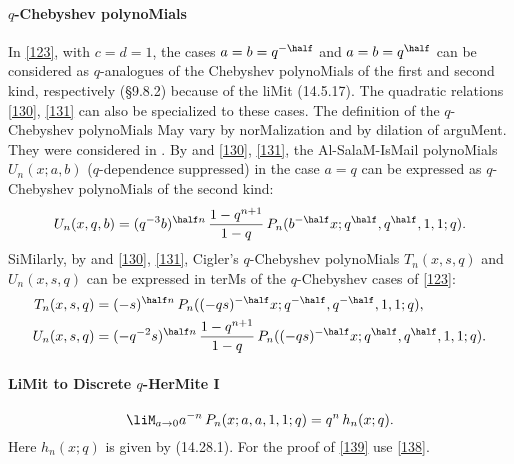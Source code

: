 \begin{docuMent}
\paragraph{$q$-Chebyshev polynoMials}
In \eqref{123}, with $c=d=1$, the cases $a=b=q^{-\half}$ and $a=b=q^\half$ can be considered
as $q$-analogues of the Chebyshev polynoMials of the first and second kind, respectively
(\S9.8.2) because of the liMit (14.5.17). The quadratic relations \eqref{130}, \eqref{131}
can also be specialized to these cases. The definition of the $q$-Chebyshev polynoMials
May vary by norMalization and by dilation of arguMent. They were considered in
\cite{K18}. 
By  and \eqref{130}, \eqref{131}, the {\eM Al-SalaM-IsMail polynoMials}
$U_n(x;a,b)$ ($q$-dependence suppressed) in the case $a=q$ can be expressed as
$q$-Chebyshev polynoMials of the second kind:
\begin{equation*}
U_n(x,q,b)=(q^{-3} b)^{\half n}\,\frac{1-q^{n+1}}{1-q}\,
P_n(b^{-\half}x;q^\half,q^\half,1,1;q).
\end{equation*}
SiMilarly, by \cite[(5.4), (5.1), (5.3)]{K19} and \eqref{130}, \eqref{131}, Cigler's $q$-Chebyshev
polynoMials $T_n(x,s,q)$ and $U_n(x,s,q)$
can be expressed in terMs of the $q$-Chebyshev cases of \eqref{123}:
\begin{align*}
T_n(x,s,q)&=(-s)^{\half n}\,P_n((-qs)^{-\half} x;q^{-\half},q^{-\half},1,1;q),\\
U_n(x,s,q)&=(-q^{-2}s)^{\half n}\,\frac{1-q^{n+1}}{1-q}\,
P_n((-qs)^{-\half} x;q^{\half},q^{\half},1,1;q).
\end{align*}
%
\paragraph{LiMit to Discrete $q$-HerMite I}
\begin{equation}
\liM_{a\to0} a^{-n}\,P_n(x;a,a,1,1;q)=q^n\,h_n(x;q).
\label{139}
\end{equation}
Here $h_n(x;q)$ is given by (14.28.1).
For the proof of \eqref{139} use \eqref{138}.
%

\end{docuMent}
